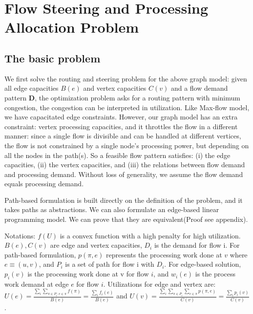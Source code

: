 \section{Flow Steering and Processing Allocation Problem}

\subsection{The basic problem}
We first solve the routing and steering problem for the above graph model: given all edge capacities $B(e)$ and vertex capacities $C(v)$ and a flow demand pattern $\mathbf{D}$, the optimization problem asks for a routing pattern with minimum congestion, the congestion can be interpreted in utilization. Like Max-flow model, we have capacitated edge constraints. However, our graph model has an extra constraint: vertex processing capacities, and it throttles the flow in a different manner: since a single flow is divisible and can be handled at different vertices, the flow is not constrained by a single node's processing power, but depending on all the nodes in the path(s). So a feasible flow pattern satisfies: (i) the edge capacities, (ii) the vertex capacities, and (iii) the relations between flow demand and processing demand. Without loss of generality, we assume the flow demand equals processing demand. 

Path-based formulation is built directly on the definition of the problem, and it takes paths as abstractions. We can also formulate an edge-based linear programming model. We can prove that they are equivalent(Proof see appendix). 

Notations: $f(U)$ is a convex function with a high penalty for high utilization. $B(e), C(v)$ are edge and vertex capacities, $D_i$ is the demand for flow i. For path-based formulation, $p(\pi,e)$ represents the processing work done at $v$ where $e\equiv(u,v)$, and $P_i$ is a set of path for flow i with $D_i$. For edge-based solution, $p_i(v)$ is the processing work done at v for flow $i$, and $w_i(e)$ is the process work demand at edge $e$ for flow $i$. 
Utilizations for edge and vertex are:
$U(e) = \frac{\sum\limits_i\sum \limits_{\pi\in P_i:e\in \pi} f(\pi)}{B(e)}=\frac{\sum\limits_{i} f_{i}(e)} {B(e)}$ and 
$U(v) = \frac{ \sum\limits_i \sum \limits_{\pi\in P_i} \sum \limits_{ e\in \pi} p(\pi, e) } {C(v)}=\frac{ \sum\limits_i p_i(v)}{C(v)}$.

